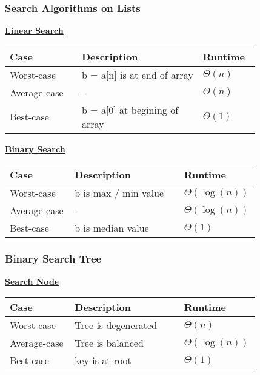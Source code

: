     \subsubsection{Search Algorithms on Lists} \label{sec_search_list}
        {\centering\underline{\textbf{Linear Search}} \par}
        \begin{tabular*}{\linewidth}{| p{0.25\linewidth} | p{0.42\linewidth} | p{0.15\linewidth} |}
            \hline
            Case & Description & Runtime\\
            \hline \hline
            Worst-case & b = a[n] is at end of array & $\Theta(n)$ \\
            \hline
            Average-case & - & $\Theta(n)$ \\
            \hline
            Best-case & b = a[0] at begining of array & $\Theta(1)$ \\
            \hline
        \end{tabular*}

        {\centering\underline{\textbf{Binary Search}} \par}
        \begin{tabular*}{\linewidth}{| p{0.25\linewidth} | p{0.42\linewidth} | p{0.15\linewidth} |}
            \hline
            Case & Description & Runtime\\
            \hline \hline
            Worst-case & b is max / min value & $\Theta(\log(n))$ \\
            \hline
            Average-case & - & $\Theta(\log(n))$ \\
            \hline
            Best-case & b is median value & $\Theta(1)$ \\
            \hline
        \end{tabular*}

    \subsubsection{Binary Search Tree}
        {\centering\underline{\textbf{Search Node}} \par}
        \begin{tabular*}{\linewidth}{| p{0.25\linewidth} | p{0.42\linewidth} | p{0.15\linewidth} |}
            \hline
            Case & Description & Runtime\\
            \hline \hline
            Worst-case & Tree is degenerated & $\Theta(n)$ \\
            \hline
            Average-case & Tree is balanced & $\Theta(\log(n))$ \\
            \hline
            Best-case & key is at root & $\Theta(1)$ \\
            \hline
        \end{tabular*}


